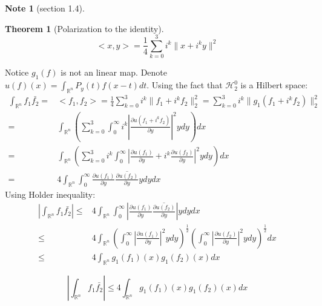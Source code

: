\documentclass{report}
\theoremstyle{definition}
\newtheorem{note}{Note}
\theoremstyle{definition}
\theoremstyle{plain}
\newtheorem{theorem}{Theorem}
\numberwithin{theorem}{section}
\numberwithin{remark}{section}
\numberwithin{equation}{section}
\newcommand{\norm}[1]{\lVert#1\rVert}
\newcommand{\abs}[1]{\left\lvert#1\right\rvert}
\begin{document}
\begin{note}[section 1.4]
    \begin{theorem}[Polarization to the identity]
        \begin{equation*}
            <x,y>=\frac{1}{4}\sum_{k=0}^3 i^k\norm{x+i^ky}^2
        \end{equation*}
    \end{theorem}
Notice $g_1(f)$ is not an linear map. Denote $u(f)(x)=\int_{\mathbb{R}^n}{P_y(t)f(x-t)d t}$. Using the fact that $\mathscr{H}_2^0$ is a Hilbert space:
\begin{align*}
    \int_{\mathbb{R}^n}{f_1\bar{f_2}}=&<f_1,f_2>=\frac{1}{4}\sum_{k=0}^3 i^k\norm{f_1+i^kf_2}_2^2=\sum_{k=0}^3 i^k\norm{g_1(f_1+i^kf_2)}_2^2\\
    =&\int_{\mathbb{R}^n}{(\sum_{k=0}^3 \int_0^{\infty}i^k\abs{\frac{\partial u(f_1+i^kf_2)}{\partial y}}^2 y d y )}dx\\
    =&\int_{\mathbb{R}^n}{(\sum_{k=0}^3 i^k\int_0^{\infty}\abs{\frac{\partial u(f_1)}{\partial y}+i^k\frac{\partial u(f_2)}{\partial y}}^2 y d y  )}dx\\
    =&4\int_{\mathbb{R}^n}{\int_0^{\infty}{\frac{\partial u(f_1)}{\partial y}\overline{\frac{\partial u(f_2)}{\partial y}}} y d y  }dx
\end{align*}
Using Holder inequality:
\begin{align*}
    \abs{\int_{\mathbb{R}^n}{f_1\bar{f_2}}}\leq& 4\int_{\mathbb{R}^n}{\int_0^{\infty}\abs{\frac{\partial u(f_1)}{\partial y}\overline{\frac{\partial u(f_2)}{\partial y}}} y d y  }dx\\
    \leq& 4\int_{\mathbb{R}^n} \left(\int_0^{\infty}    \abs{\frac{\partial u(f_1)}{\partial y}}^2y d y  \right)^\frac{1}{2} \left(\int_0^{\infty}   \abs{\frac{\partial u(f_2)}{\partial y}}^2y d y  \right)^\frac{1}{2} dx\\
    \leq& 4\int_{\mathbb{R}^n} g_1(f_1)(x) g_1(f_2)(x) dx
\end{align*}
\end{note}
\begin{errata}[P85]
    \begin{equation*}
        \abs{\int_{\mathbb{R}^n}{f_1\bar{f_2}}}    \leq 4\int_{\mathbb{R}^n} g_1(f_1)(x) g_1(f_2)(x) dx
    \end{equation*}
\end{errata}
\end{document}
